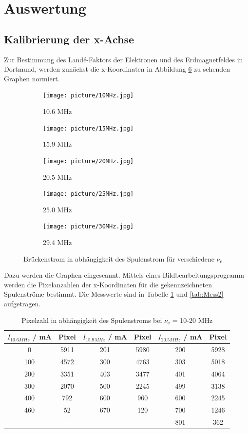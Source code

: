\section{Auswertung}
\label{sec:Auswertung}

\subsection{Kalibrierung der x-Achse}
Zur Bestimmung des Land\'{e}-Faktors der Elektronen und des Erdmagnetfeldes in Dortmund, werden zunächst die x-Koordinaten in Abbildung \ref{fig:Skizze} zu sehenden Graphen normiert.
\begin{figure}
  \centering
  \begin{subfigure}[b]{0.49\textwidth}
     \texttt{[image: picture/10MHz.jpg]}
     \caption{10.6 MHz}
     \label{fig:10Skiz}
  \end{subfigure}
  \begin{subfigure}[b]{0.49\textwidth}
     \texttt{[image: picture/15MHz.jpg]}
     \caption{15.9 MHz}
     \label{fig:15Skiz}
  \end{subfigure}
  \begin{subfigure}[b]{0.49\textwidth}
     \texttt{[image: picture/20MHz.jpg]}
     \caption{20.5 MHz}
     \label{fig:20Skiz}
  \end{subfigure}
  \begin{subfigure}[b]{0.49\textwidth}
     \texttt{[image: picture/25MHz.jpg]}
     \caption{25.0 MHz}
     \label{fig:25Skiz}
  \end{subfigure}
  \begin{subfigure}[b]{0.49\textwidth}
     \texttt{[image: picture/30MHz.jpg]}
     \caption{29.4 MHz}
     \label{fig:30Skiz}
  \end{subfigure}
  \caption{Brückenstrom in abhängigkeit des Spulenstrom für verschiedene $\nu_\text{e}$}
  \label{fig:Skizze}
\end{figure}
Dazu werden die Graphen eingescannt. Mittels eines Bildbearbeitungsprogramm werden die Pixelanzahlen der x-Koordinaten für die gekennzeichneten Spulenströme bestimmt. Die Messwerte sind in Tabelle \ref{tab:Mess1} und \ref{tab:Mess2} aufgetragen. 
\begin{table}
  \centering
  \caption{Pixelzahl in abhängigkeit des Spulenstroms bei $\nu_\text{e}$ = 10-20 MHz}
  \begin{tabular}{c c|c c|c c}
    \toprule
    	$I_{10.6 MHz}$ / mA & Pixel & $I_{15.9 MHz}$ / mA & Pixel & $I_{20.5 MHz}$ / mA & Pixel \\    
    \midrule
	0   & 5911 & 201 & 5980 & 200 & 5928 \\
	100 & 4572 & 300 & 4763 & 303 & 5018 \\
	200 & 3351 & 403 & 3477 & 401 & 4064 \\
	300 & 2070 & 500 & 2245 & 499 & 3138 \\
	400 & 792  & 600 & 960  & 600 & 2245 \\
	460 & 52   & 670 & 120  & 700 & 1246 \\
	--- & ---  & --- & ---  & 801 & 362  \\
    \bottomrule 
  \end{tabular}
  \label{tab:Mess1}
\end{table}
